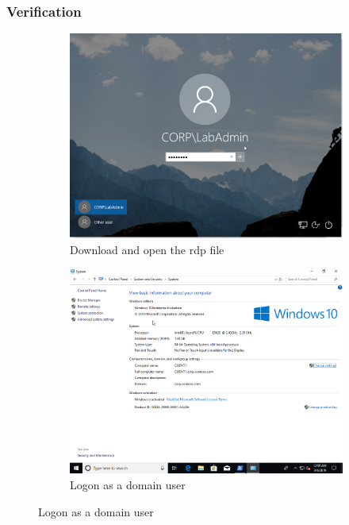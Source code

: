 \subsubsection{Verification}
\begin{figure}[h]
	\begin{subfigure}{0.5\textwidth}
		\captionsetup{width=0.8\linewidth}
		\includegraphics[width=0.9\linewidth]{img/Methodologie/Verification4.png}
		\centering
		\caption{Download and open the \acrshort{rdp} file}
	\end{subfigure}
	\begin{subfigure}{0.5\textwidth}
		\captionsetup{width=0.8\linewidth}
		\includegraphics[width=0.9\linewidth]{img/Methodologie/Verification5.png} 
		\centering
		\caption{Logon as a domain user}
	\end{subfigure}
\end{figure}

